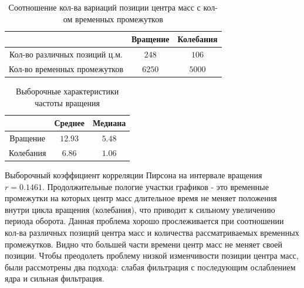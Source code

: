 \documentclass[a4paper,12pt]{article} %
\begin{document}
	\begin{table}[H]
		\caption{Соотношение кол-ва вариаций позиции центра масс с кол-ом временных промежутков}
		\label{tab:my_label1}
		\begin{center}
			\vspace{5mm}
			\begin{tabular}{|c|c|c|}
				\hline
				 & Вращение & Колебания\\
				\hline
				Кол-во различных позиций ц.м. & $ 248 $ & $ 106 $\\
				\hline
				Кол-во временных промежутков & $ 6250 $ & $ 5000 $\\
				\hline
			\end{tabular}
		\end{center}
	\end{table}
	
	\begin{table}[H]
		\caption{Выборочные характеристики частоты вращения}
		\label{tab:my_label2}
		\begin{center}
			\vspace{5mm}
			\begin{tabular}{|c|c|c|}
				\hline
				& Среднее & Медиана\\
				\hline
				Вращение & $ 12.93 $ & $ 5.48 $\\
				\hline
				Колебания & $ 6.86 $ & $ 1.06 $\\
				\hline
			\end{tabular}
		\end{center}
	\end{table}

	Выборочный коэффициент корреляции Пирсона на интервале вращения $r = 0.1461$.
	\newline Продолжительные пологие участки графиков - это временные промежутки на которых центр масс длительное время не меняет положения внутри цикла вращения (колебания), что приводит к сильному увеличению периода оборота. Данная проблема хорошо прослеживается при соотношении кол-ва различных позиций центра масс и количества рассматриваемых временных промежутков. Видно что большей части времени центр масс не меняет своей позиции.
	\newline Чтобы преодолеть проблему низкой изменчивости позиции центра масс, были рассмотрены два подхода: слабая фильтрация с последующим ослаблением ядра и сильная фильтрация.
	
\end{document}
